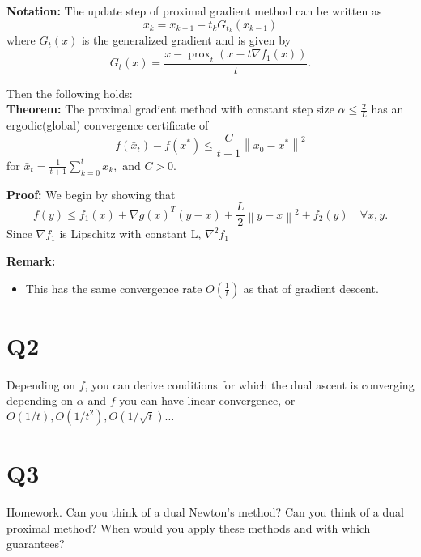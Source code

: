 \documentclass[12pt]{article}
\theoremstyle{mystyle}
\begin{document}
\textbf{Notation: }The update step of proximal gradient method can be written as
$$x_k = x_{k-1} - t_kG_{t_k}(x_{k-1})$$ 
where $G_t(x)$ is the generalized gradient and is given by 
$$G_t(x)= \frac{x- \operatorname{prox}_t (x - t\nabla f_1(x))}{t}.$$

Then the following holds:\\
\textbf{Theorem:} The proximal gradient method with constant step size $\alpha \leq \frac{2}{L}$
has an ergodic(global) convergence certificate of 
$$
f\left(\bar{x}_t\right)-f\left(x^*\right) \leq \frac{C}{t+1}\left\|x_0-x^*\right\|^2
$$
for $\bar{x}_t=\frac{1}{t+1} \sum_{k=0}^t x_k, \text { and } C>0$.

\textbf{Proof:}
We begin by showing that 
$$f(y) \leq f_1(x) + \nabla g(x)^T(y-x) + \frac{L}{2}\left\|y-x\right\|^2 + f_2(y) \quad \forall x,y.$$
Since $\nabla f_1$ is Lipschitz with constant L, $\nabla^2 f_1 $

\textbf{Remark:} 
\begin{itemize}
    \item This has the same convergence rate $O(\frac{1}{t})$ as that of gradient descent.
\end{itemize}

\section{Q2}
Depending on $f$, you can derive conditions for which the dual ascent is converging depending on $\alpha$ and $f$ you can have linear convergence, or $O(1 / t), O\left(1 / t^2\right), O(1 / \sqrt{t}) \ldots$

\section{Q3}
Homework. Can you think of a dual Newton’s method? Can you think of a
dual proximal method? When would you apply these methods and with
which guarantees?
\end{document}
